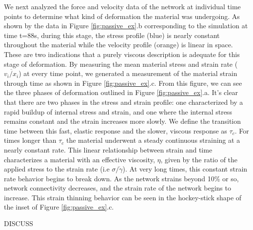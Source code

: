 \documentclass[10pt,letterpaper]{article}
\begin{document}
We next analyzed the force and velocity data of the network at individual time points to determine what kind of deformation the material was undergoing.  As shown by the data in Figure \ref{fig:passive_ex}.b corresponding to the simulation at time t=88s, during this stage, the stress profile (blue) is nearly constant throughout the material while the velocity profile (orange) is linear in space.  These are two indications that a purely viscous description is adequate for this stage of deformation.  By measuring the mean material stress and strain rate ($\overline{v_i/x_i}$) at every time point, we generated a measurement of the material strain through time as shown in Figure \ref{fig:passive_ex}.c.  From this figure, we can see the three phases of deformation outlined in Figure \ref{fig:passive_ex}.a.  It's clear that there are two phases in the stress and strain profile: one characterized by a rapid buildup of internal stress and strain, and one where the internal stress remains constant and the strain increases more slowly.  We define the transition time between this fast, elastic response and the slower, viscous response as $\tau_c$. For times longer than $\tau_c$ the material underwent a steady continuous straining at a nearly constant rate.  This linear relationship between strain and time characterizes a material with an effective viscosity, $\eta$, given by the ratio of the applied stress to the strain rate (i.e $\sigma/\dot{\gamma}$).  At very long times, this constant strain rate behavior begins to break down.   As the network strains beyond 10\% or so, network connectivity decreases, and the strain rate of the network begins to increase.  This strain thinning behavior can be seen in the hockey-stick shape of the inset of Figure \ref{fig:passive_ex}.c.

DISCUSS
\end{document}
